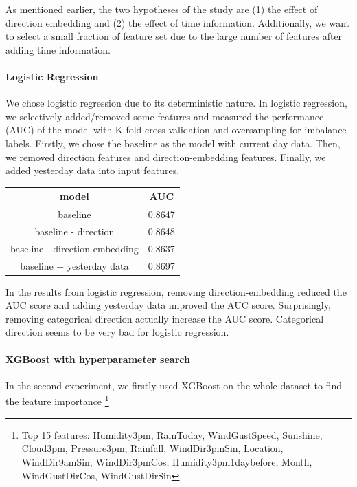 \documentclass{article}
\begin{document}
As mentioned earlier, the two hypotheses of the study are (1) the effect of direction embedding and (2) the effect of time information. Additionally, we want to select a small fraction of feature set due to the large number of features after adding time information.

\paragraph{Logistic Regression}

We chose logistic regression due to its deterministic nature. In logistic regression, we selectively added/removed some features and measured the performance (AUC) of the model with K-fold cross-validation and oversampling for imbalance labels. Firstly, we chose the baseline as the model with current day data. Then, we removed direction features and direction-embedding features. Finally, we added yesterday data into input features.

\begin{center}
 \begin{tabular}{||c c||} 
 \hline
  model & AUC \\ [0.5ex] 
 \hline\hline
 baseline & 0.8647 \\ 
 \hline
baseline - direction & 0.8648 \\
 \hline
baseline - direction embedding & 0.8637 \\
 \hline
baseline + yesterday data & 0.8697 \\
 \hline
\end{tabular}
\end{center}

In the results from logistic regression, removing direction-embedding reduced the AUC score and adding yesterday data improved the AUC score. Surprisingly, removing categorical direction actually increase the AUC score. Categorical direction seems to be very bad for logistic regression.

\paragraph{XGBoost with hyperparameter search}

In the second experiment, we firstly used XGBoost \cite{Chen:2016:XST:2939672.2939785} on the whole dataset to find the feature importance \footnote{Top 15 features: Humidity3pm, RainToday, WindGustSpeed, Sunshine, Cloud3pm, Pressure3pm, Rainfall, WindDir3pmSin, Location, WindDir9amSin, WindDir3pmCos, Humidity3pm1daybefore, Month, WindGustDirCos, WindGustDirSin}
\end{document}
